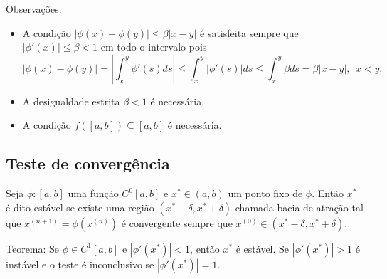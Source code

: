\documentclass[main.tex]{subfiles}
\begin{document}
Observações:
\begin{itemize}
\item A condição $|\phi(x)-\phi(y)|\leq \beta |x-y|$ é satisfeita sempre que $|\phi'(x)|\leq \beta<1$ em todo o intervalo pois
$$|\phi(x)-\phi(y)|=\left|\int_x^y\phi'(s)ds\right|\leq \int_x^y|\phi'(s)|ds\leq \int_x^y\beta ds=\beta|x-y|,~~ x<y.$$

\item A desigualdade estrita $\beta<1$ é necessária.

\item A condição $f([a,b])\subseteq [a,b]$ é necessária.

\end{itemize}


\subsection{Teste de convergência}
Seja $\phi :[a,b]$ uma função $C^0[a,b]$ e $x^*\in(a,b)$ um ponto fixo de $\phi$. Então $x^*$ é dito estável se existe uma região $(x^*-\delta,x^*+\delta)$ chamada bacia de atração tal que $x^{(n+1)}=\phi(x^{(n)})$ é convergente sempre que $x^{(0)}\in(x^*-\delta,x^*+\delta)$.

Teorema: Se $\phi\in C^1[a,b]$ e  $|\phi'(x^*)|<1$, então $x^*$ é estável. Se $|\phi'(x^*)|>1$ é instável e o teste é inconclusivo se $|\phi'(x^*)|=1$.
\end{document}
